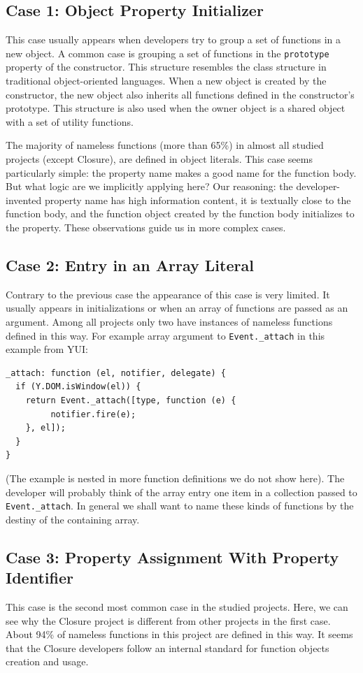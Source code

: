 \documentclass[10pt, preprint]{sigplanconf}
\begin{document}
\subsection{Case 1: Object Property Initializer}
 This case usually appears when developers try to group a set of functions in a new object. A common case is grouping a set of functions in the {\small\texttt{prototype}} property of the constructor. This structure resembles the class structure in traditional object-oriented languages. When a new object is created by the constructor, the new object also inherits all functions defined in the constructor's prototype. This structure is also used  when the owner object is a shared object with a set of utility functions.
 
 The majority of nameless functions (more than 65\%) in almost all studied projects (except Closure), are defined in object literals. This case seems particularly simple: the property name makes a good name for the function body. But what logic are we implicitly applying here? Our reasoning: the developer-invented property name has high information content, it is textually close to the function body, and the function object created by the function body initializes to the property. These observations guide us in more complex cases.
 
\subsection{Case 2: Entry in an Array Literal}
Contrary to the previous case the appearance of this case is very limited. It usually appears in initializations or when an array of functions are passed as an argument. Among all projects only two have instances of nameless functions defined in this way. For example array argument to \verb|Event._attach| in this example from YUI:
\begin{verbatim}
_attach: function (el, notifier, delegate) {
  if (Y.DOM.isWindow(el)) {
    return Event._attach([type, function (e) {
         notifier.fire(e);
    }, el]);
  }
}
\end{verbatim}
(The example is nested in more function definitions we do not show here). The developer will probably think of the array entry one item in a collection passed to \verb|Event._attach|. In general we shall want to name these kinds of functions by the destiny of the containing array.

\subsection{Case 3: Property Assignment With Property Identifier}
This case is the second most common case in the studied projects. Here, we can see why the Closure project is different from other projects in the first case. About 94\% of nameless functions in this project are defined in this way. It seems that the Closure developers follow an internal standard for function objects creation and usage.  
\end{document}
